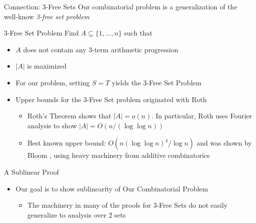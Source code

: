 \begin{frame}{Connection: 3-Free Sets}
Our combinatorial problem is a generalization of the well-know \textit{3-free set problem}

\begin{block}{3-Free Set Problem}
	Find $A \subseteq \{1,\dotsc,n\}$ such that
	\begin{itemize}
		\item $A$ does not contain any 3-term arithmetic progression
		\item $|A|$ is maximized
	\end{itemize}
\end{block}
\begin{itemize}
	\item For our problem, setting $S = T$ yields the 3-Free Set Problem
	\item Upper bounds for the 3-Free Set problem originated with Roth \cite{Roth53}
	\begin{itemize}
		\item Roth's Theorem shows that $|A| = o(n)$. In particular, Roth uses Fourier analysis to show $|A| = O(n / (\log \log n))$
		\item Best known upper bound: $O(n(\log \log n)^4 / \log n)$ and was shown by Bloom \cite{Bloom16}, using heavy machinery from additive combinatorics
	\end{itemize}
\end{itemize}
\end{frame}

\begin{frame}{A Sublinear Proof}

\begin{itemize}
	\item Our goal is to show sublinearity of Our Combinatorial Problem
	\begin{itemize}
		\item The machinery in many of the proofs for 3-Free Sets do not easily generalize to analysis over 2 sets 
	\end{itemize}
\end{itemize}




\end{frame}


